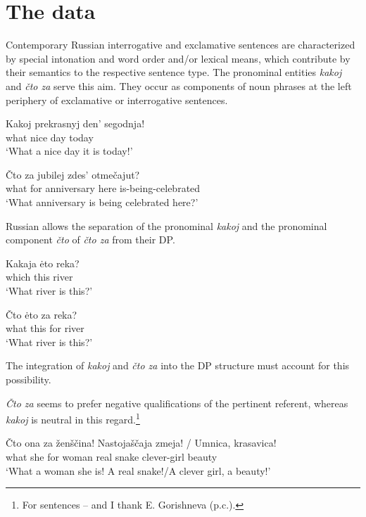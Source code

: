 \documentclass[output=paper,colorlinks,citecolor=brown]{langscibook}
\begin{document}
\section{The data} \label{sec:zi08:2}

Contemporary Russian interrogative and exclamative sentences are characterized by special intonation and word order and/or lexical means, which contribute by their semantics to the respective sentence type. The pronominal entities \textit{kakoj} and \textit{čto za} serve this aim. They occur as components of noun phrases at the left periphery of exclamative or interrogative sentences.

\ea \label{ex:zi08:1}
    \gll Kakoj prekrasnyj den' segodnja!\\
    what nice day today\\
    \glt `What a nice day it is today!'
\z

\ea \label{ex:zi08:2}
    \gll Čto za jubilej zdes' otmečajut?\\
    what for anniversary here is-being-celebrated\\
    \glt `What anniversary is being celebrated here?'
\z

\noindent Russian allows the separation of the pronominal \textit{kakoj} and the pronominal component \textit{čto} of \textit{čto za} from their DP.

\ea \label{ex:zi08:3}
    \gll Kakaja ėto reka?\\
    which this river\\
    \glt `What river is this?'
\z

\ea \label{ex:zi08:4}
    \gll Čto ėto za reka?\\
    what this for river\\
    \glt `What river is this?'
\z

\noindent The integration of \textit{kakoj} and \textit{čto za} into the DP structure must account for this possibility.

\textit{Čto za} seems to prefer negative qualifications of the pertinent referent, where\-as \textit{kakoj} is neutral in this regard.{\footnote{\label{fn:zi08:1}For sentences -- and  I thank E. Gorishneva (p.c.).}}

\ea \label{ex:zi08:5}
    \gll Čto ona za ženščina! Nastojaščaja zmeja! /  Umnica, krasavica!\\
    what she for woman real snake {} {} clever-girl beauty\\
    \glt `What a woman she is! A real snake!/A clever girl, a beauty!'
\z
\end{document}
